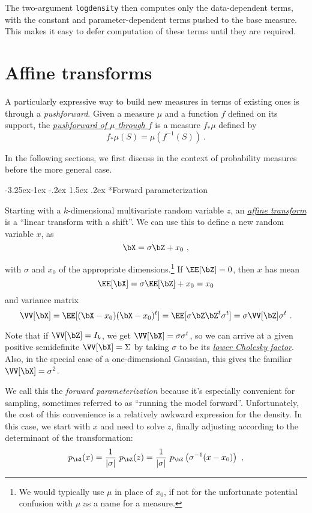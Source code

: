\documentclass{juliacon}
\makeatletter
\renewcommand\subsection{\@startsection{subsection}{2}{\z@}%
{-3.25ex\@plus -1ex \@minus -.2ex}%
{1.5ex \@plus .2ex}%
{\normalfont\bfseries}}
\makeatother
\begin{document}
The two-argument \verb|logdensity| then computes only the data-dependent terms, with the constant and parameter-dependent terms pushed to the base measure. This makes it easy to defer computation of these terms until they are required.


\section{Affine transforms}
\label{affine}

A particularly expressive way to build new measures in terms of existing ones is through a \emph{pushforward}. Given a measure $\mu$ and a function $f$ defined on its support, the \href{https://en.wikipedia.org/wiki/Pushforward_measure}{\emph{pushforward of $\mu$ through $f$}} is a measure $f_*\mu$ defined by
\[
f_*\mu(S) = \mu(f^{-1}(S))\ .
\]

In the following sections, we first discuss in the context of probability measures before the more general case.

\subsection*{Forward parameterization}

Starting with a $k$-dimensional multivariate random variable $z$, an \href{https://en.wikipedia.org/wiki/Affine_transformation}{\emph{affine transform}} is a ``linear transform with a shift''. We can use this to define a new random variable $x$, as
\[
\bX = \sigma \bZ + x_0\ ,
\]

with $\sigma$ and $x_0$ of the appropriate dimensions.\footnote{We would typically use $\mu$ in place of $x_0$, if not for the unfortunate potential confusion with $\mu$ as a name for a measure.} If $\EE[\bZ]=0$, then $x$ has mean
\[
\EE[\bX] = \sigma \EE[\bZ] + x_0 = x_0
\]
and variance matrix
\[
\VV[\bX] = \EE[(\bX-x_0)(\bX-x_0)^t] = \EE[\sigma \bZ \bZ^t \sigma^t] = \sigma \VV[\bZ] \sigma^t\ .
\]

Note that if $\VV[\bZ]=I_k$, we get $\VV[\bX]=\sigma \sigma^t$, so we can arrive at a given positive semidefinite $\VV[\bX]=\Sigma$ by taking $\sigma$ to be its \href{https://en.wikipedia.org/wiki/Cholesky_decomposition}{\emph{lower Cholesky factor}}. Also, in the special case of a one-dimensional Gaussian, this gives the familiar $\VV[\bX] = \sigma^2$.

We call this the \emph{forward parameterization} because it's especially convenient for sampling, sometimes referred to as ``running the model forward''. Unfortunately, the cost of this convenience is a relatively awkward expression for the density. In this case, we start with $x$ and need to solve $z$, finally adjusting according to the determinant of the transformation:
\[
p_\bX(x) = \frac{1}{|\sigma|}\ p_\bZ(z) = \frac{1}{|\sigma|}\ p_\bZ\left(\sigma^{-1} (x - x_0)\right)\ ,
\]
\end{document}
